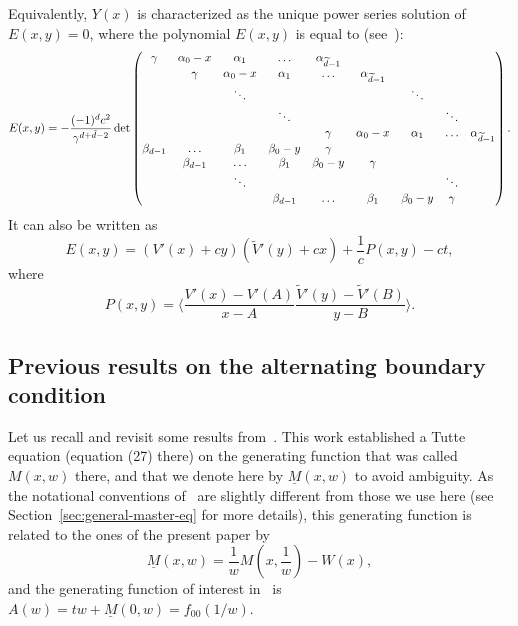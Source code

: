 \documentclass{scrartcl}
\newcommand\brak[1]{\big \langle #1 \big\rangle}
\newcommand\ul[1]{\underline{#1}}
\begin{document}
Equivalently,  $Y(x)$ is characterized as the unique power series solution of $E(x,y)=0$, where the polynomial $E(x,y)$ is equal to (see~\cite[Theorem 8.3.2]{eynard}):
\begin{equation}
 E(x,y) = -\frac{(-1)^{d}c^2}{\gamma^{d+\tilde d-2}}\det
 \begin{pmatrix}
  \gamma & \alpha_0-x &  \alpha_{1} & \ldots  & \alpha_{\widetilde{d}-1} &  & & & \cr
 & \gamma & \alpha_0-x & \alpha_{1} &\ldots  & \alpha_{\widetilde{d}-1} &  & &  \cr
 & & \ddots &  &  &  & \ddots &  &   \cr
 & & & \ddots &  &  &  & \ddots &     \cr
 & & & & \gamma & \alpha_0-x &  \alpha_{1} & \ldots &\alpha_{\widetilde{d}-1}     \cr
  \beta_{d-1} &  \ldots & \beta_1 & \beta_0-y & \gamma & & & \cr
 & \beta_{d-1}& \ldots & \beta_1 & \beta_0-y & \gamma & & \cr
 & & \ddots &  &  &  &  & \ddots & \cr
 & & & \beta_{d-1} & \ldots & \beta_1 & \beta_0-y & \gamma & \cr
 \end{pmatrix}.
\label{eq:master-equation-monochromatic-case}
\end{equation}
It can also be written as
\begin{equation}
  E(x,y)=(V'(x)+cy)(\tilde V'(y)+cx)+ \frac{1}{c}P(x,y)- ct,
\label{eq:E-def}
\end{equation}
where
\begin{equation}
  P(x,y)= \brak{\frac{V'(x)-V'(A)}{x-A}\frac{\tilde V'(y)-\tilde V'(B)}{y-B}}.
\end{equation}

\subsection{Previous results on the alternating boundary condition}
\label{subsec:constell}

Let us recall and revisit some results from~\cite{bouttier-carrance}. This work established a Tutte equation (equation (27) there) on the generating function that was called $M(x,w)$ there, and that we denote here by $\underline{M}(x,w)$ to avoid ambiguity. As the notational conventions of~\cite{bouttier-carrance} are slightly different from those we use here (see Section~\ref{sec:general-master-eq} for more details), this generating function is related to the ones of the present paper by
\[
\ul M(x,w)=\frac{1}{w}M\left(x,\frac{1}{w}\right)-W(x),
\]
and the generating function of interest in~\cite{bouttier-carrance} is $A(w)=tw+ \ul M(0,w)=f_{00}(1/w)$. 
\end{document}
